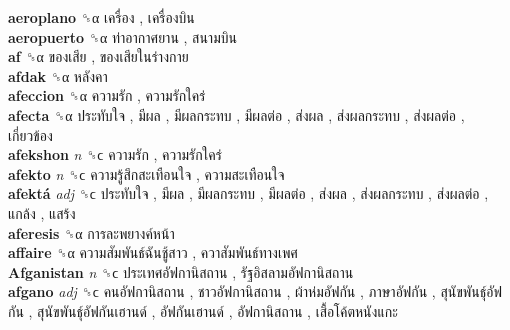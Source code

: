 \textbf{aeroplano} ␝α   เครื่อง ,  เครื่องบิน   \\
\textbf{aeropuerto} ␝α   ท่าอากาศยาน ,  สนามบิน   \\
\textbf{af} ␝α   ของเสีย ,  ของเสียในร่างกาย   \\
\textbf{afdak} ␝α   หลังคา   \\
\textbf{afeccion} ␝α   ความรัก ,  ความรักใคร่   \\
\textbf{afecta} ␝α   ประทับใจ ,  มีผล ,  มีผลกระทบ ,  มีผลต่อ ,  ส่งผล ,  ส่งผลกระทบ ,  ส่งผลต่อ ,  เกี่ยวข้อง   \\
\textbf{afekshon} \emph{n}  ␝ϲ   ความรัก ,  ความรักใคร่   \\
\textbf{afekto} \emph{n}  ␝ϲ   ความรู้สึกสะเทือนใจ ,  ความสะเทือนใจ   \\
\textbf{afektá} \emph{adj}  ␝ϲ   ประทับใจ ,  มีผล ,  มีผลกระทบ ,  มีผลต่อ ,  ส่งผล ,  ส่งผลกระทบ ,  ส่งผลต่อ ,  แกล้ง ,  แสร้ง   \\
\textbf{aferesis} ␝α   การละพยางค์หน้า   \\
\textbf{affaire} ␝α   ความสัมพันธ์ฉันชู้สาว ,  ควาสัมพันธ์ทางเพศ   \\
\textbf{Afganistan} \emph{n}  ␝ϲ   ประเทศอัฟกานิสถาน ,  รัฐอิสลามอัฟกานิสถาน   \\
\textbf{afgano} \emph{adj}  ␝ϲ   คนอัฟกานิสถาน ,  ชาวอัฟกานิสถาน ,  ผ้าห่มอัฟกัน ,  ภาษาอัฟกัน ,  สุนัขพันธุ์อัฟกัน ,  สุนัขพันธุ์อัฟกันเฮานด์ ,  อัฟกันเฮานด์ ,  อัฟกานิสถาน ,  เสื้อโค้ตหนังแกะ   \\
